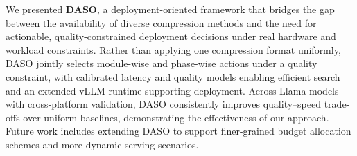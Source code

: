 \documentclass[letterpaper]{article} %
\begin{document}
We presented \textbf{DASO}, a deployment-oriented framework that bridges the gap between the availability of diverse compression methods and the need for actionable, quality-constrained deployment decisions under real hardware and workload constraints. Rather than applying one compression format uniformly, DASO jointly selects module-wise and phase-wise actions under a quality constraint, with calibrated latency and quality models enabling efficient search and an extended vLLM runtime supporting deployment. Across Llama models with cross-platform validation, DASO consistently improves quality--speed trade-offs over uniform baselines, demonstrating the effectiveness of our approach. Future work includes extending DASO to support finer-grained budget allocation schemes and more dynamic serving scenarios.




% 
\end{document}
